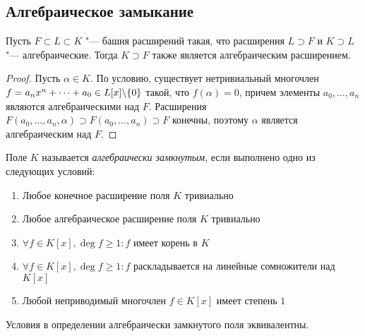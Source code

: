 \subsection{Алгебраическое замыкание}

\begin{proposition}
	Пусть $F \subset L \subset K$ "--- башня расширений такая, что расширения $L \supset F$ и $K \supset L$ "--- алгебраические. Тогда $K \supset F$ также является алгебраическим расширением.
\end{proposition}

\begin{proof}
	Пусть $\alpha \in K$. По условию, существует нетривиальный многочлен $f \hm= a_nx^n + \dotsb + a_0 \in L[x] \backslash \{0\}$ такой, что $f(\alpha) = 0$, причем элементы $a_0, \dotsc, a_n$ являются алгебраическими над $F$. Расширения $F(a_0, \dotsc, a_n, \alpha) \supset F(a_0, \dotsc, a_n) \supset F$ конечны, поэтому $\alpha$ является алгебраическим над $F$.
\end{proof}

\begin{definition}
	Поле $K$ называется \textit{алгебраически замкнутым}, если выполнено одно из следующих условий:
	\begin{enumerate}
		\item Любое конечное расширение поля $K$ тривиально
		\item Любое алгебраическое расширение поля $K$ тривиально
		\item $\forall f \in K[x], \deg{f} \ge 1: f$ имеет корень в $K$
		\item $\forall f \in K[x], \deg{f} \ge 1: f$ раскладывается на линейные сомножители над $K[x]$
		\item Любой неприводимый многочлен $f \in K[x]$ имеет степень $1$
	\end{enumerate}
\end{definition}

\begin{proposition}
	Условия в определении алгебраически замкнутого поля эквивалентны.
\end{proposition}

